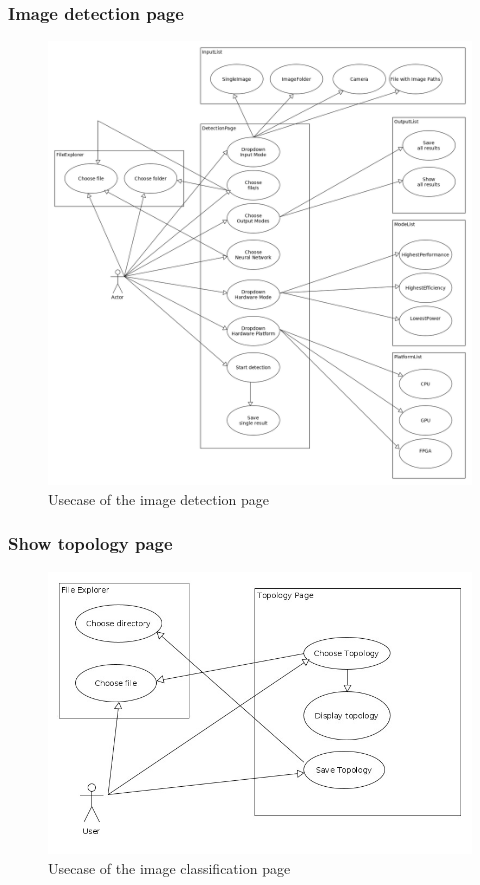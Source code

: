 \documentclass[parskip=full]{scrartcl}
\begin{document}
\subsubsection{Image detection page}
\begin{figure}[htb!]
\centering
\includegraphics[width=\textwidth]{objectDetectionUsecase}
\caption{Usecase of the image detection page}
\end{figure}
\newpage
\subsubsection{Show topology page}
\begin{figure}[htb!]
\centering
\includegraphics[width=\textwidth]{ShowTopoUsecase}
\caption{Usecase of the image classification page}
\end{figure}
\newpage
\end{document}
